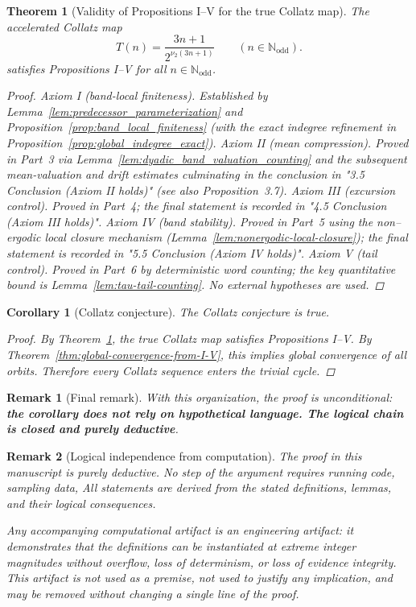 \documentclass[preprint,12pt]{elsarticle}
\newtheorem{remark}{Remark}
\newtheorem{theorem}{Theorem}
\newtheorem{corollary}{Corollary}
\begin{document}
\begin{theorem}[Validity of Propositions I--V for the true Collatz map]
\label{thm:validity-I-V}
The accelerated Collatz map
\[
T(n)=\frac{3n+1}{2^{\nu_2(3n+1)}}\qquad (n\in\mathbb{N}_{\mathrm{odd}}).
\]
satisfies Propositions I–V for all $n\in\mathbb{N}_{\mathrm{odd}}$.
\begin{proof}
\emph{Axiom I (band-local finiteness).} Established by Lemma~\ref{lem:predecessor_parameterization} and Proposition~\ref{prop:band_local_finiteness} (with the exact indegree refinement in Proposition~\ref{prop:global_indegree_exact}).
\emph{Axiom II (mean compression).} Proved in Part~3 via Lemma~\ref{lem:dyadic_band_valuation_counting} and the subsequent mean-valuation and drift estimates culminating in the conclusion in "3.5 Conclusion (Axiom II holds)" (see also Proposition~3.7).
\emph{Axiom III (excursion control).} Proved in Part~4; the final statement is recorded in "4.5 Conclusion (Axiom III holds)".
\emph{Axiom IV (band stability).} Proved in Part~5 using the non--ergodic local closure mechanism (Lemma~\ref{lem:nonergodic-local-closure}); the final statement is recorded in "5.5 Conclusion (Axiom IV holds)".
\emph{Axiom V (tail control).} Proved in Part~6 by deterministic word counting; the key quantitative bound is Lemma~\ref{lem:tau-tail-counting}.
No external hypotheses are used.
\end{proof}
\end{theorem}

\begin{corollary}[Collatz conjecture]
\label{cor:collatz-from-main-theorems}
The Collatz conjecture is true.
\begin{proof}
By Theorem~\ref{thm:validity-I-V}, the true Collatz map satisfies Propositions I--V. By Theorem~\ref{thm:global-convergence-from-I-V}, this implies global convergence of all orbits. Therefore every Collatz sequence enters the trivial cycle.
\end{proof}
\end{corollary}

\begin{remark}[Final remark]
With this organization, the proof is unconditional: \textbf{the corollary does not rely on hypothetical language. The logical chain is closed and purely deductive}.
\end{remark}

\begin{remark}[Logical independence from computation]
The proof in this manuscript is purely deductive.
No step of the argument requires running code, sampling data,
All statements are derived from the stated definitions, lemmas,
and their logical consequences.

Any accompanying computational artifact is an \emph{engineering artifact}: it demonstrates that the definitions
can be instantiated at extreme integer magnitudes without overflow,
loss of determinism, or loss of evidence integrity. This artifact is
\emph{not} used as a premise, not used to justify any implication,
and may be removed without changing a single line of the proof.
\end{remark}
\end{document}
